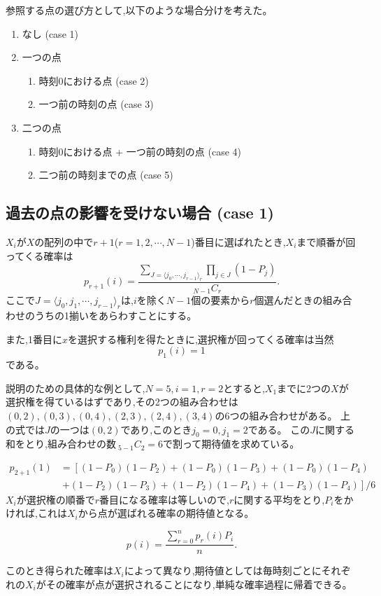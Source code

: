 参照する点の選び方として,以下のような場合分けを考えた。


\begin{enumerate}
    \item なし (case 1)
    \item 一つの点
    \begin{enumerate}
        \item 時刻0における点 (case 2)
        \item 一つ前の時刻の点 (case 3)
        \end{enumerate}
    \item 二つの点
    \begin{enumerate}
        \item 時刻0における点 + 一つ前の時刻の点 (case 4)
        \item 二つ前の時刻までの点 (case 5)
        \end{enumerate}
\end{enumerate}

\subsection{過去の点の影響を受けない場合 (case 1)}

$X_{i}$が$X$の配列の中で$r+1$($r = 1, 2, \cdots , N-1$)番目に選ばれたとき,$X_{i}$まで順番が回ってくる確率は
\[p_{r+1}(i) = \frac{\sum_{J = \langle j_{0}, \cdots ,j_{r-1} \rangle _{r}}\prod_{j\in J}(1-P_{j})}{_{N-1}C_{r}}.\]
ここで$J = \langle j_{0}, j_{1}, \cdots ,j_{r-1} \rangle_{r}$は,$i$を除く$N-1$個の要素から$r$個選んだときの組み合わせのうちの1揃いをあらわすことにする。


また,1番目に$x$を選択する権利を得たときに,選択権が回ってくる確率は当然
\[p_{1}(i) = 1\]
である。


説明のための具体的な例として,$N = 5, i = 1, r = 2$とすると,$X_{1}$までに2つの$X$が選択権を得ているはずであり,その2つの組み合わせは$(0,2), (0,3), (0,4), (2,3), (2,4), (3,4)$の6つの組み合わせがある。
上の式では$J$の一つは$(0, 2)$であり,このとき$j_{0} = 0, j_{1} = 2$である。
この$J$に関する和をとり,組み合わせの数$\ _{5-1}C_{2} = 6$で割って期待値を求めている。

\begin{align}
p_{2+1}(1) &= \left[(1-P_{0})(1-P_{2}) + (1-P_{0})(1-P_{3}) + (1-P_{0})(1-P_{4}) \right. \nonumber \\
&\ \left. + (1-P_{2})(1-P_{3}) + (1-P_{2})(1-P_{4}) + (1-P_{3})(1-P_{4}) \right]/6
\end{align}
$X_{i}$が選択権の順番で$r$番目になる確率は等しいので,$r$に関する平均をとり,$P_{i}$をかければ,これは$X_{i}$から点が選ばれる確率の期待値となる。


\[p(i) = \frac{\sum_{r=0}^{n}p_{r}(i)P_{i}}{n}.\]

このとき得られた確率は$X_{i}$によって異なり,期待値としては毎時刻ごとにそれぞれの$X_{i}$がその確率が点が選択されることになり,単純な確率過程に帰着できる。


